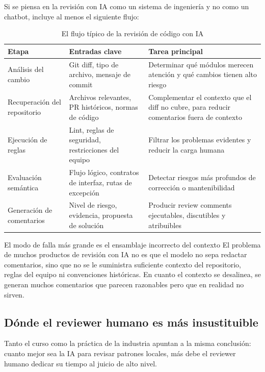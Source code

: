 \documentclass[a4paper]{article}
\begin{document}
Si se piensa en la revisión con IA como un sistema de ingeniería y no como un chatbot, incluye al menos el siguiente flujo:

\begin{table}[H]
\centering
\begin{tabular}{p{} p{} p{}}
\toprule
Etapa & Entradas clave & Tarea principal \\
\midrule
Análisis del cambio & Git diff, tipo de archivo, mensaje de commit & Determinar qué módulos merecen atención y qué cambios tienen alto riesgo \\
Recuperación del repositorio & Archivos relevantes, PR históricos, normas de código & Complementar el contexto que el diff no cubre, para reducir comentarios fuera de contexto \\
Ejecución de reglas & Lint, reglas de seguridad, restricciones del equipo & Filtrar los problemas evidentes y reducir la carga humana \\
Evaluación semántica & Flujo lógico, contratos de interfaz, rutas de excepción & Detectar riesgos más profundos de corrección o mantenibilidad \\
Generación de comentarios & Nivel de riesgo, evidencia, propuesta de solución & Producir review comments ejecutables, discutibles y atribuibles \\
\bottomrule
\end{tabular}
\caption{El flujo típico de la revisión de código con IA}
\end{table}

\begin{warningbox}{El modo de falla más grande es el ensamblaje incorrecto del contexto}
El problema de muchos productos de revisión con IA no es que el modelo no sepa redactar comentarios, sino que no se le suministra suficiente contexto del repositorio, reglas del equipo ni convenciones históricas. En cuanto el contexto se desalinea, se generan muchos comentarios que parecen razonables pero que en realidad no sirven.
\end{warningbox}

\subsection{Dónde el reviewer humano es más insustituible}

Tanto el curso como la práctica de la industria apuntan a la misma conclusión: cuanto mejor sea la IA para revisar patrones locales, más debe el reviewer humano dedicar su tiempo al juicio de alto nivel.
\end{document}
